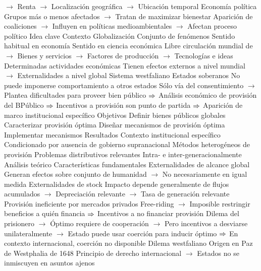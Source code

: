 \documentclass{nuevotema}
\begin{document}
\begin{esquemal}
				\4[] $\to$ Renta
				\4[] $\to$ Localización geográfica
				\4[] $\to$ Ubicación temporal
				\4 Economía política
				\4[] Grupos más o menos afectados
				\4[] $\to$ Tratan de maximizar bienestar
				\4[] Aparición de coaliciones
				\4[] $\to$ Influyen en políticas medioambientales
				\4[] $\to$ Afectan proceso político
	\1 
		\2 Idea clave
			\3 Contexto
				\4 Globalización
				\4[] Conjunto de fenómenos
				\4[] Sentido habitual en economía
				\4 Sentido en ciencia económica
				\4[] Libre circulación mundial de
				\4[] $\to$ Bienes y servicios
				\4[] $\to$ Factores de producción
				\4[] $\to$ Tecnologías e ideas
				\4 Determinadas actividades económicas
				\4[] Tienen efectos externos a nivel mundial
				\4[] $\to$ Externalidades a nivel global
				\4 Sistema westfaliano
				\4[] Estados soberanos
				\4[] No puede imponerse comportamiento a otros estados
				\4[] Sólo vía del consentimiento
				\4[] $\to$ Plantea dificultades para proveer bien público
				\4[] $\Rightarrow$ Análisis económico de provisión del BPúblico
				\4[] $\Rightarrow$ Incentivos a provisión son punto de partida
				\4[] $\Rightarrow$ Aparición de marco institucional específico
			\3 Objetivos
				\4 Definir bienes públicos globales
				\4 Caracterizar provisión óptima
				\4 Diseñar mecanismos de provisión óptima
				\4 Implementar mecanismos
			\3 Resultados
				\4 Contexto institucional específico
				\4 Condicionado por ausencia de gobierno supranacional
				\4 Métodos heterogéneos de provisión
				\4 Problemas distributivos relevantes
				\4[] Intra- e inter-generacionalmente
		\2 Análisis teórico
			\3 Características fundamentales
				\4 Externalidades de alcance global
				\4[] Generan efectos sobre conjunto de humanidad
				\4[] $\to$ No necesariamente en igual medida
				\4 Externalidades de stock
				\4[] Impacto depende generalmente de flujos acumulados
				\4[] $\to$ Depreciación relevante
				\4[] $\to$ Tasa de generación relevante
				\4 Provisión ineficiente por mercados privados
				\4[] Free-riding
				\4[] $\to$ Imposible restringir beneficios a quién financia
				\4[] $\Rightarrow$ Incentivos a no financiar provisión
				\4[] Dilema del prisionero
				\4[] $\to$ Óptimo requiere de cooperación
				\4[] $\to$ Pero incentivos a desviarse unilateralmente
				\4[] $\to$ Estado puede usar coerción para inducir óptimo
				\4[] $\Rightarrow$ En contexto internacional, coerción no disponible
				\4 Dilema westfaliano
				\4[] Origen en Paz de Westphalia de 1648
				\4[] Principio de derecho internacional
				\4[] $\to$ Estados no se inmiscuyen en asuntos ajenos

\end{esquemal}
\end{document}

